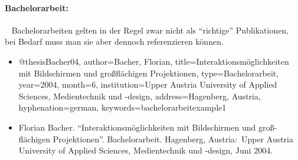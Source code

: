 
\paragraph{Bachelorarbeit:} ~ \newline
Bachelorarbeiten gelten in der Regel zwar nicht als "`richtige"' Publikationen, bei Bedarf muss man sie aber dennoch referenzieren können. 
%
\begin{itemize}
\item[]
\begin{GenericCode}[numbers=none]
@thesis{Bacher04,
	author={Bacher, Florian},
	title={Interaktionsmöglichkeiten mit Bildschirmen und großflächigen Projektionen},
	type={Bachelorarbeit},
	year={2004},
	month={6},
	institution={Upper Austria University of Applied Sciences, Medientechnik und {-design}},
	address={Hagenberg, Austria},
	hyphenation={german},
	keywords={bachelorarbeitexample1} 
}
\end{GenericCode}
\item[\cite{Bacher04}]
Florian Bacher. "`Interaktionsmöglichkeiten mit Bildschirmen und groß-
flächigen Projektionen"'. Bachelorarbeit. Hagenberg, Austria:\ Upper
Austria University of Applied Sciences, Medientechnik und {-design},
Juni 2004.
\end{itemize}
%



